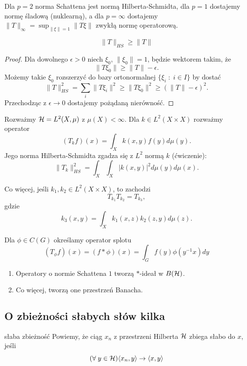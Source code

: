 Dla $p=2$ norma Schattena jest normą Hilberta-Schmidta, dla $p=1$ dostajemy normę śladową (nuklearną), a dla $p=\infty$ dostajemy $\|T\|_{\infty}=\sup_{\|\xi\|=1}\|T\xi\|$ zwykłą normę operatorową.

\begin{lemma}{}{}
  $$\|T\|_{HS}\geq \|T\|$$
\end{lemma}

\begin{proof}
  Dla dowolnego $\epsilon>0$ niech $\xi_0$, $\|\xi_0\|=1$, będzie wektorem takim, że 
  $$\|T\xi_0\|\geq \|T\|-\epsilon.$$
  Możemy takie $\xi_0$ rozszerzyć do bazy ortonormalnej $\{\xi_i\;:\;i\in I\}$ by dostać
  $$\|T\|_{HS}^2=\sum_i\|T\xi_i\|^2\geq\|T\xi_0\|^2\geq (\|T\|-\epsilon)^2.$$
  Przechodząc z $\epsilon\to 0$ dostajemy pożądaną nierówność.
\end{proof}

\begin{example}[m]
  \item Rozważmy $\operatorname{\mathcal{H}}=L^2(X,\mu)$ z $\mu(X)<\infty$. Dla $k\in L^2(X\times X)$ rozważmy operator
    $$(T_kf)(x)=\int_Xk(x,y)f(y)d\mu(y).$$
    Jego norma Hilberta-Schmidta zgadza się z $L^2$ normą $k$ (ćwiczenie):
    $$\|T_k\|^2_{HS}=\int_X\int_X |k(x,y)|^2 d\mu(y)d\mu(x).$$
    \bigskip 

    Co więcej, jeśli $k_1, k_2\in L^2(X\times X)$, to zachodzi
    $$T_{k_1}T_{k_2}=T_{k_3},$$
    gdzie
    $$k_3(x,y)=\int_X k_1(x,z)k_2(z,y)d\mu(z).$$
  \item Dla $\phi\in C(G)$ określamy operator splotu 
    $$(T_\phi f)(x)=(f\ast\phi)(x)=\int_G f(y)\phi(y^{-1}x)dy$$
\end{example}


\begin{theorem}{}{}\mbox{}
  \begin{enumerate}
    \item Operatory o normie Schattena $1$ tworzą $*$-ideał w $B(\operatorname{\mathcal{H}})$.
    \item Co więcej, tworzą one przestrzeń Banacha.
  \end{enumerate}
\end{theorem}

\subsection{O zbieżności słabych słów kilka}

\begin{definition}{słaba zbieżność}{}
  Powiemy, że ciąg $x_n$ z przestrzeni Hilberta $\operatorname{\mathcal{H}}$ zbiega słabo do $x$, jeśli 
  $$(\forall\;y\in\operatorname{\mathcal{H}})\langle x_n, y\rangle\to\langle x,y\rangle$$
\end{definition}

